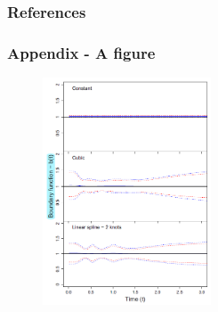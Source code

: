 \documentclass[
    11pt, %
    aspectratio=169, %
]{beamer}
\begin{document}
\begin{frame} 
        \frametitle{References}

        \printbibliography
\end{frame}

\begin{frame}[noframenumbering]
\label{Figure}
	\frametitle{Appendix - A figure}
        \hyperlink{Test}{}
        
        \begin{figure}[h!]
            \centering
            \includegraphics[angle=0, width=5cm]{Newey et al Graph.png}
        \end{figure}
\end{frame}
\end{document}
